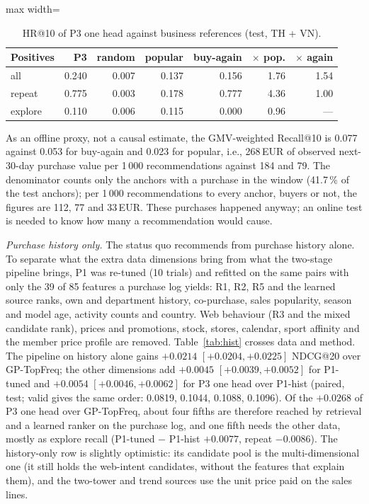 \documentclass{ieeeaccess}
\begin{document}
\begin{table}[t]
\caption{HR@10 of P3 one head against business references (test, TH + VN).}
\label{tab:t38}
\setlength{\tabcolsep}{3pt}
\centering
\begin{adjustbox}{max width=\columnwidth}
\begin{tabular}{lrrrrrr}
\toprule
Positives & P3 & random & popular & buy-again & $\times$ pop. & $\times$ again \\
\midrule
all     & 0.240 & 0.007 & 0.137 & 0.156 & 1.76 & 1.54 \\
repeat  & 0.775 & 0.003 & 0.178 & 0.777 & 4.36 & 1.00 \\
explore & 0.110 & 0.006 & 0.115 & 0.000 & 0.96 & --- \\
\bottomrule
\end{tabular}
\end{adjustbox}
\end{table}

As an offline proxy, not a causal estimate, the GMV-weighted Recall@10 is 0.077 against 0.053 for buy-again and 0.023 for popular,
i.e., 268\,EUR of observed next-30-day purchase value per 1\,000 recommendations against 184 and 79. The denominator counts only the
anchors with a purchase in the window (41.7\,\% of the test anchors); per 1\,000 recommendations to every anchor, buyers or not, the
figures are 112, 77 and 33\,EUR. These purchases happened anyway;
an online test is needed to know how many a recommendation would cause.

\textit{Purchase history only.} The status quo recommends from purchase history alone. To separate what the extra data dimensions
bring from what the two-stage pipeline brings, P1 was re-tuned (10 trials) and refitted on the same pairs with only the 39 of 85
features a purchase log yields: R1, R2, R5 and the learned source ranks, own and department history, co-purchase, sales popularity,
season and model age, activity counts and country. Web behaviour (R3 and the mixed candidate rank), prices and promotions, stock,
stores, calendar, sport affinity and the member price profile are removed. Table~\ref{tab:hist} crosses data and method. The
pipeline on history alone gains $+0.0214$ $[+0.0204, +0.0225]$ NDCG@20 over GP-TopFreq; the other dimensions add $+0.0045$
$[+0.0039, +0.0052]$ for P1-tuned and $+0.0054$ $[+0.0046, +0.0062]$ for P3 one head over P1-hist (paired, test; valid gives the
same order: 0.0819, 0.1044, 0.1088, 0.1096). Of the $+0.0268$ of P3 one head over GP-TopFreq, about four fifths are therefore reached
by retrieval and a learned ranker on the purchase log, and one fifth needs the other data, mostly as explore recall (P1-tuned $-$
P1-hist $+0.0077$, repeat $-0.0086$). The history-only row is slightly optimistic: its candidate pool is the multi-dimensional one
(it still holds the web-intent candidates, without the features that explain them), and the two-tower and trend sources use the
unit price paid on the sales lines.
\end{document}
